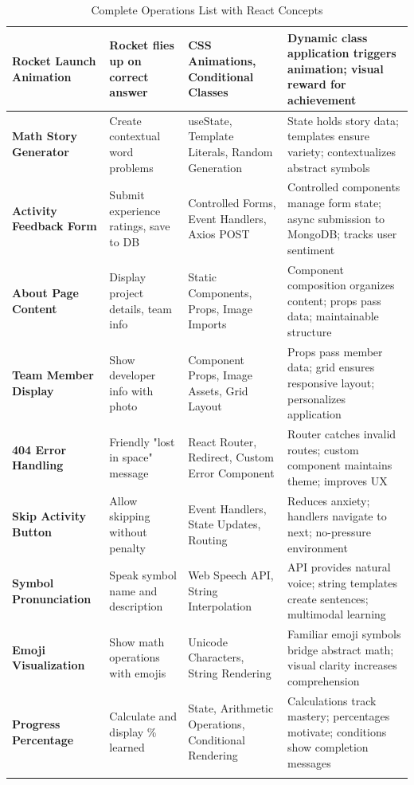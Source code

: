 \documentclass[12pt, a4paper]{article}
\begin{document}
\begin{longtable}{|>{\raggedright}p{3cm}|>{\raggedright}p{3.5cm}|>{\raggedright}p{3.5cm}|>{\raggedright\arraybackslash}p{4cm}|}
\textbf{Rocket Launch Animation} & Rocket flies up on correct answer & CSS Animations, Conditional Classes & Dynamic class application triggers animation; visual reward for achievement \\
\hline

\textbf{Math Story Generator} & Create contextual word problems & useState, Template Literals, Random Generation & State holds story data; templates ensure variety; contextualizes abstract symbols \\
\hline

\textbf{Activity Feedback Form} & Submit experience ratings, save to DB & Controlled Forms, Event Handlers, Axios POST & Controlled components manage form state; async submission to MongoDB; tracks user sentiment \\
\hline

\textbf{About Page Content} & Display project details, team info & Static Components, Props, Image Imports & Component composition organizes content; props pass data; maintainable structure \\
\hline

\textbf{Team Member Display} & Show developer info with photo & Component Props, Image Assets, Grid Layout & Props pass member data; grid ensures responsive layout; personalizes application \\
\hline

\textbf{404 Error Handling} & Friendly "lost in space" message & React Router, Redirect, Custom Error Component & Router catches invalid routes; custom component maintains theme; improves UX \\
\hline

\textbf{Skip Activity Button} & Allow skipping without penalty & Event Handlers, State Updates, Routing & Reduces anxiety; handlers navigate to next; no-pressure environment \\
\hline

\textbf{Symbol Pronunciation} & Speak symbol name and description & Web Speech API, String Interpolation & API provides natural voice; string templates create sentences; multimodal learning \\
\hline

\textbf{Emoji Visualization} & Show math operations with emojis & Unicode Characters, String Rendering & Familiar emoji symbols bridge abstract math; visual clarity increases comprehension \\
\hline

\textbf{Progress Percentage} & Calculate and display \% learned & State, Arithmetic Operations, Conditional Rendering & Calculations track mastery; percentages motivate; conditions show completion messages \\
\hline

\caption{Complete Operations List with React Concepts}
\end{longtable}
\end{document}
